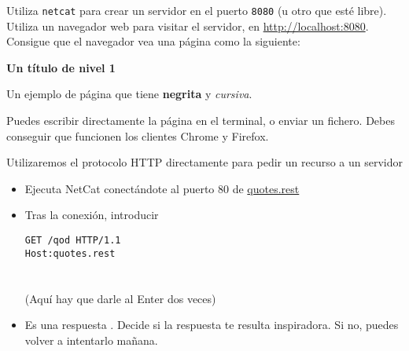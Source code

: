 \begin{homeworkProblem}

  Utiliza \texttt{netcat} para crear un servidor en el puerto \texttt{8080} (u otro que esté libre). Utiliza un navegador web para visitar el servidor, en \url{http://localhost:8080}. Consigue que el navegador vea una página como la siguiente:

  \begin{cuadrito}
    {\large \textbf{Un título de nivel 1}}
    
    Un ejemplo de página que tiene \textbf{negrita} y \textit{cursiva}.
  \end{cuadrito}

  Puedes escribir directamente la página en el terminal, o enviar un fichero. Debes conseguir que funcionen los clientes Chrome y Firefox.
  
\end{homeworkProblem}


\newpage

\begin{homeworkProblem}
  Utilizaremos el protocolo HTTP directamente para pedir un recurso a un servidor
  \begin{itemize}
  \item Ejecuta NetCat conectándote al puerto 80 de \url{quotes.rest}
  \item Tras la conexión, introducir
    \begin{cuadrito}
      \texttt{GET /qod HTTP/1.1} \\
      \texttt{Host:quotes.rest} \\
      \\
      \\
      (Aquí hay que darle al Enter dos veces)
    \end{cuadrito}
  \item Es una respuesta . Decide si la respuesta te resulta inspiradora. Si no, puedes volver a intentarlo mañana.
  \end{itemize}
\end{homeworkProblem}





